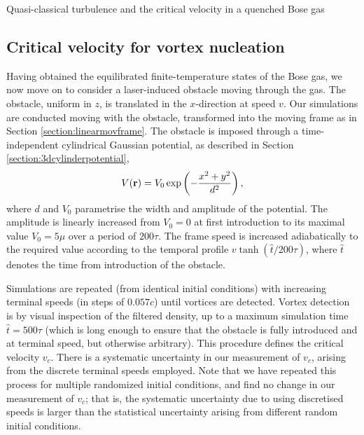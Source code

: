 \begin{chapter}{\label{cha:nonequib}Quasi-classical turbulence and the critical velocity in a quenched Bose gas}
\subsection{Critical velocity for vortex nucleation}
Having obtained the equilibrated finite-temperature states of the Bose gas, we now move on to consider a laser-induced obstacle moving through the gas.  The obstacle, uniform in $z$, is translated in the $x$-direction at speed $v$.  Our simulations are conducted moving with the obstacle, transformed into the moving frame as in Section \ref{section:linearmovframe}. The obstacle is imposed through a time-independent cylindrical Gaussian potential, as described in Section \ref{section:3dcylinderpotential},
\begin{equation*}
  V({\bf r}) = V_0 \exp\left ( -\frac{x^2+y^2}{d^2}\right ),
\end{equation*}
where $d$ and $V_0$ parametrise the width and amplitude of the potential. The amplitude is linearly increased from $V_0 = 0$ at first introduction to its maximal value $V_0=5\mu$ over a period of $200\tau$.   The frame speed is increased adiabatically to the required value according to the temporal profile $v \tanh(\hat{t}/200 \tau)$, where $\hat{t}$ denotes the time from introduction of the obstacle.

Simulations are repeated (from identical initial conditions) with increasing terminal speeds (in steps of $0.057c$) until vortices are detected.  Vortex detection is by visual inspection of the filtered density, up to a maximum simulation time $\hat{t}=500\tau$ (which is long enough to ensure that the obstacle is fully introduced and at terminal speed, but otherwise arbitrary). This procedure defines the critical velocity $v_c$.  There is a systematic uncertainty in our measurement of $v_c$, arising from the discrete terminal speeds employed.  Note that we have repeated this process for multiple randomized initial conditions, and find no change in our measurement of $v_c$; that is, the systematic uncertainty due to using discretised speeds is larger than the statistical uncertainty arising from different random initial conditions.


\end{chapter}
